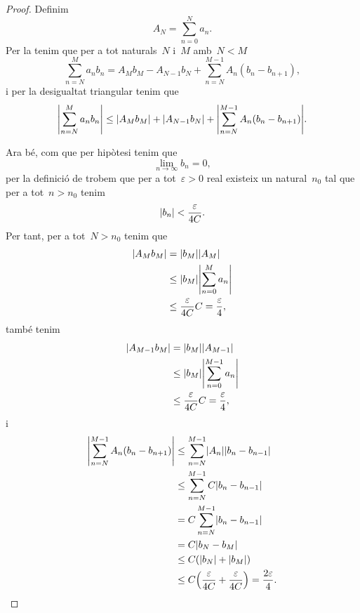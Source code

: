 \documentclass[../analisi-matematica.tex]{subfiles}
\begin{document}
    \begin{proof}
        Definim
        \[
            A_{N}=\sum_{n=0}^{N}a_{n}.
        \]
        Per la  tenim que per a tot naturals~\(N\) i~\(M\) amb~\(N<M\)
        \[
            \sum_{n=N}^{M}a_{n}b_{n}=A_{M}b_{M}-A_{N-1}b_{N}+\sum_{n=N}^{M-1}A_{n}(b_{n}-b_{n+1}),
        \]
        i per la desigualtat triangular %
        tenim que
        \begin{equation}
            \label{thm:Teorema-de-Dirichlet-per-series-numeriques:eq1}
            \abs{\sum_{n=N}^{M}a_{n}b_{n}}\leq\abs{A_{M}b_{M}}+\abs{A_{N-1}b_{N}}+\abs{\sum_{n=N}^{M-1}A_{n}(b_{n}-b_{n+1})}.
        \end{equation}

        Ara bé, com que per hipòtesi tenim que
        \[
            \lim_{n\to\infty}b_{n}=0,
        \]
        per la definició de  trobem que per a tot~\(\varepsilon>0\) real existeix un natural~\(n_{0}\) tal que per a tot~\(n>n_{0}\) tenim
        \[
            \abs{b_{n}}<\frac{\varepsilon}{4C}.
        \]
        Per tant, per a tot~\(N>n_{0}\) tenim que
        \begin{align*}
            \abs{A_{M}b_{M}}&=\abs{b_{M}}\abs{A_{M}} \\
            &\leq\abs{b_{M}}\abs{\sum_{n=0}^{M}a_{n}} \\ %
            &\leq\frac{\varepsilon}{4C}C=\frac{\varepsilon}{4},
        \end{align*}
        també tenim
        \begin{align*}
            \abs{A_{M-1}b_{M}}&=\abs{b_{M}}\abs{A_{M-1}} \\
            &\leq\abs{b_{M}}\abs{\sum_{n=0}^{M-1}a_{n}} \\ %
            &\leq\frac{\varepsilon}{4C}C=\frac{\varepsilon}{4},
        \end{align*}
        i
        \begin{align*}
            \abs{\sum_{n=N}^{M-1}A_{n}(b_{n}-b_{n+1})}&\leq\sum_{n=N}^{M-1}\abs{A_{n}}\abs{b_{n}-b_{n-1}} \\
            &\leq\sum_{n=N}^{M-1}C\abs{b_{n}-b_{n-1}} \\
            &=C\sum_{n=N}^{M-1}\abs{b_{n}-b_{n-1}} \\
            &=C\abs{b_{N}-b_{M}} \\
            &\leq C(\abs{b_{N}}+\abs{b_{M}}) \\
            &\leq C\left(\frac{\varepsilon}{4C}+\frac{\varepsilon}{4C}\right)=\frac{2\varepsilon}{4}.

\end{align*}
\end{proof}
\end{document}
